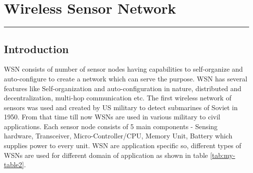 \chapter{Wireless Sensor Network}
\label{C2} %
\graphicspath{{Figures/PDF/}{Figures/PNG/}}
\noindent\rule{\linewidth}{2pt}
\section{Introduction}
WSN consists of number of sensor nodes having capabilities to self-organize and auto-configure to create a network which can serve the purpose. WSN has several features like Self-organization and auto-configuration in nature, distributed and decentralization, multi-hop communication etc. The first wireless network of sensors was used and created by US military to detect submarines of Soviet in 1950. From that time till now WSNs are used in various military to civil applications. Each sensor node consists of 5 main components - Sensing hardware, Transceiver, Micro-Controller/CPU, Memory Unit, Battery which supplies power to every unit. WSN are application specific so, different types of WSNs are used for different domain of application \cite{articleTypesWSN} as shown in table \ref{tab:my-table2}.
\begin{table}[]
\centering
\caption{Types of WSN}
\label{tab:my-table2}
\end{table}
